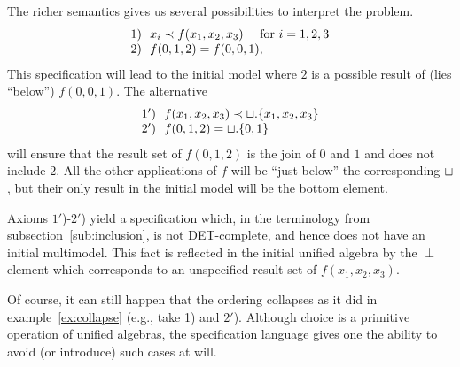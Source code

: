 {\begin{Example}\label{ex:unif} 
The richer semantics gives us several possibilities to interpret the problem. 
\[ \begin{array}{r@{\ \ }l}
	1) & x_{i} \Incl f(x_{1},x_{2},x_{3})\ \ \ \   {\rm for\ } i=1,2,3 \\
	2) & f(0,1,2) = f(0,0,1),
	\end{array} \] 
This specification will lead to the initial model where $2$ is a possible result of (lies ``below'') $f(0,0,1).$ 
The alternative
\[ \begin{array}{r@{\ \ }l}
	1') & f(x_{1},x_{2},x_{3}) \Incl \ch.\{x_{1},x_{2},x_{3}\} \\
	2') & f(0,1,2) = \ch.\{0,1\}
\end{array} \]
will ensure that the result set of $f(0,1,2)$ is the join of $0$ and 
$1$ and does not include $2$. All the other 
applications of $f$ will be ``just below'' the corresponding $\sqcup$, but their only result in the initial model 
will be the bottom element. 
\end{Example}
 
Axioms $1'$)-$2'$) yield a specification which, in the terminology from 
subsection~\ref{sub:inclusion}, is not DET-complete, and hence 
does not have an initial multimodel. This fact is reflected in the initial 
unified algebra by the $\perp$ element 
which corresponds to an unspecified result set of $f(x_{1},x_{2},x_{3})$.
 
Of course, it can still happen that the ordering collapses as it did in 
example~\ref{ex:collapse} (e.g., take 1) and 
$2'$). Although choice is a primitive operation of unified algebras, the specification language gives one the 
ability to avoid (or introduce) such cases at will. 

}
